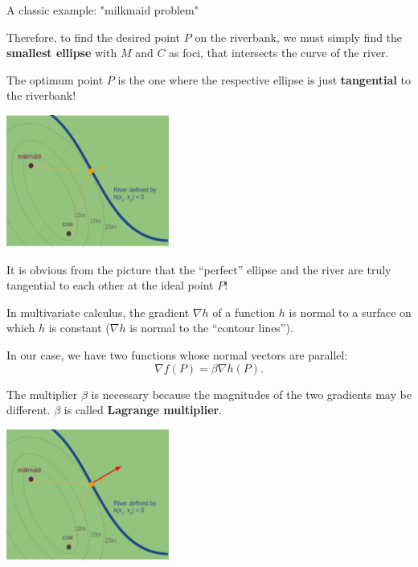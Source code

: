 \documentclass[11pt,compress,t,notes=noshow, xcolor=table]{beamer}
\begin{document}
\begin{vbframe}{A classic example: "milkmaid problem"}
\framebreak

Therefore, to find the desired point $P$ on the riverbank, we must simply find the \textbf{smallest ellipse} with $M$ and $C$ as foci, that intersects the curve of the river. 

\vspace*{0.2cm} 

The optimum point $P$ is the one where the respective ellipse is just \textbf{tangential} to the riverbank! 

\begin{center}
	\includegraphics[width = 0.4\textwidth]{figure_man/milkmaid4.png}
\end{center}

It is obvious from the picture that the \enquote{perfect} ellipse and the river are truly tangential to each other at the ideal point $P$! 


\framebreak 

In multivariate calculus, the gradient $\nabla h$ of a function $h$ is normal to a surface on which $h$ is constant ($\nabla h$ is normal to the \enquote{contour lines}). 

\vspace*{0.2cm}

In our case, we have two functions whose normal vectors are parallel: 
$$
	\nabla f(P) = \beta \nabla h(P). 
$$

The multiplier $\beta$ is necessary because the magnitudes of the two gradients may be different. $\beta$ is called \textbf{Lagrange multiplier}. 

\begin{center}
	\includegraphics[width = 0.4\textwidth]{figure_man/milkmaid5.png}
\end{center}

\end{vbframe}
\end{document}
